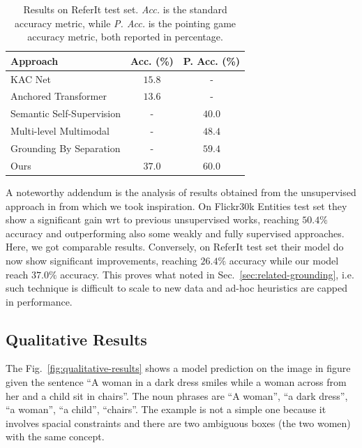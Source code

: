 \begin{table}
  \centering
  \begin{tabular}{lcc}
    \toprule
    Approach & Acc. (\%) & P. Acc. (\%) \\
    \midrule
    KAC Net \cite{chen2018knowledge}                         & $15.8$ & -      \\
    Anchored Transformer \cite{zhao2018weakly}               & $13.6$ & -      \\
    Semantic Self-Supervision \cite{javed2018learning}       & -      & $40.0$ \\
    Multi-level Multimodal \cite{akbari2019multi}            & -      & $48.4$ \\
    Grounding By Separation \cite{arbelle2021detector}       & -      & $59.4$ \\
    \midrule
    Ours                                                     & $\bm{37.0}$ & $60.0$ \\
    \bottomrule
  \end{tabular}
  \caption[Results on ReferIt test set]{Results on ReferIt test set.
  \textit{Acc.} is the standard accuracy metric, while \textit{P.
  Acc.} is the pointing game accuracy metric, both reported in
  percentage.}
  \label{tab:results-referit}
\end{table}

A noteworthy addendum is the analysis of results obtained from the
unsupervised approach in \cite{wang2019phrase} from which we took
inspiration. On Flickr30k Entities test set they show a significant
gain wrt to previous unsupervised works, reaching $50.4\%$ accuracy
and outperforming also some weakly and fully supervised approaches.
Here, we got comparable results. Conversely, on ReferIt test set their
model do now show significant improvements, reaching $26.4\%$ accuracy
while our model reach $37.0\%$ accuracy. This proves what noted in
Sec.~\ref{sec:related-grounding}, i.e. such technique is difficult to
scale to new data and ad-hoc heuristics are capped in performance.

\subsection{Qualitative Results}

The Fig.~\ref{fig:qualitative-results} shows a model prediction on the
image in figure given the sentence ``A woman in a dark dress smiles
while a woman across from her and a child sit in chairs''. The noun
phrases are ``A woman'', ``a dark dress'', ``a woman'', ``a child'',
``chairs''. The example is not a simple one because it involves
spacial constraints and there are two ambiguous boxes (the two women)
with the same concept. 

